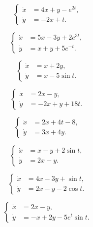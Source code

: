 \begin{multicols}{2}
	\begin{problem}
		\[ \left\{ \begin{aligned}
			\dot x &= 4 x + y - e^{2 t}, \\
			\dot y &= - 2 x + t.
		\end{aligned} \right. \]
	\end{problem}
	
	\begin{problem}
		\[ \left\{ \begin{aligned}
			\dot x &= 5 x - 3 y + 2 e^{3 t}, \\
			\dot y &= x + y + 5 e^{-t}.
		\end{aligned} \right. \]
	\end{problem}

	\begin{problem}
		\[ \left\{ \begin{aligned}
			\dot x &= x + 2 y, \\
			\dot y &= x - 5 \sin t.
		\end{aligned} \right. \]
	\end{problem}

	\begin{problem}
		\[ \left\{ \begin{aligned}
			\dot x &= 2 x - y, \\
			\dot y &= - 2 x + y + 18 t.
		\end{aligned} \right. \]
	\end{problem}
\end{multicols}

\begin{multicols}{2}
	\begin{problem}
		\[ \left\{ \begin{aligned}
			\dot x &= 2 x + 4 t - 8, \\
			\dot y &= 3 x + 4 y.
		\end{aligned} \right. \]
	\end{problem}
	
	\begin{problem}
		\[ \left\{ \begin{aligned}
			\dot x &= x - y + 2 \sin t, \\
			\dot y &= 2 x - y.
		\end{aligned} \right. \]
	\end{problem}
	
	\begin{problem}
		\[ \left\{ \begin{aligned}
			\dot x &= 4 x - 3 y + \sin t, \\
			\dot y &= 2 x - y - 2 \cos t.
		\end{aligned} \right. \]
	\end{problem}

	\begin{problem}
		\[ \left\{ \begin{aligned}
			\dot x &= 2 x - y, \\
			\dot y &= - x + 2 y - 5 e^t \sin t.
		\end{aligned} \right. \]
	\end{problem}
\end{multicols}
